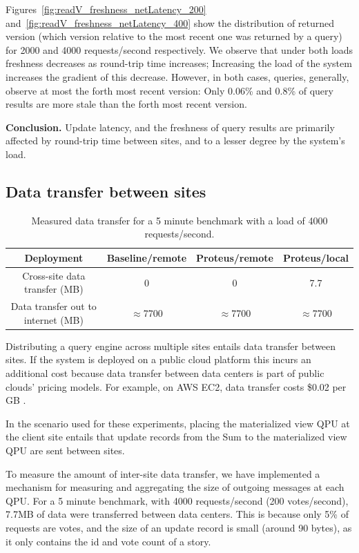 Figures~\ref{fig:readV_freshness_netLatency_200} and~\ref{fig:readV_freshness_netLatency_400}
show the distribution of returned version (which version relative to the most recent one was returned by a query)
for 2000 and 4000 requests/second respectively.
We observe that under both loads freshness decreases as round-trip time increases;
Increasing the load of the system increases the gradient of this decrease.
However, in both cases, queries, generally, observe at most the forth most recent version:
Only 0.06\% and 0.8\% of query results are more stale than the forth most recent version.

\medskip
\noindent
\textbf{Conclusion.}
Update latency, and the freshness of query results are primarily affected by round-trip time between sites,
and to a lesser degree by the system's load.

\subsection{Data transfer between sites}
\label{sec:eval_data_transfer}

\begin{table}[H]
\centering
\begin{tabular}{|c||c|c|c||}
\hline
Deployment & Baseline/remote & Proteus/remote & Proteus/local \\
\hline
Cross-site data transfer (MB) & 0 & 0 & 7.7 \\
\hline
Data transfer out to internet (MB) & $\approx$7700 & $\approx$7700 & $\approx$7700 \\
\hline
\end{tabular}
\caption{Measured data transfer for a 5 minute benchmark with a load of 4000 requests/second.}
\label{tab:data_transfer}
\end{table}

Distributing a query engine across multiple sites entails data transfer between sites.
If the system is deployed on a public cloud platform this incurs an additional cost
because data transfer between data centers is part of public clouds' pricing models.
For example, on AWS EC2, data transfer costs \$0.02 per GB \cite{aws:pricing}.

In the scenario used for these experiments, placing the materialized view QPU at the client site entails that
update records from the Sum to the materialized view QPU are sent between sites.

To measure the amount of inter-site data transfer,
we have implemented a mechanism for measuring and aggregating the size of outgoing messages at each QPU.
For a 5 minute benchmark, with 4000 requests/second (200 votes/second), 7.7MB of data were transferred between data centers.
This is because only 5\% of requests are votes, and the size of an update record is small (around 90 bytes),
as it only contains the id and vote count of a story.


